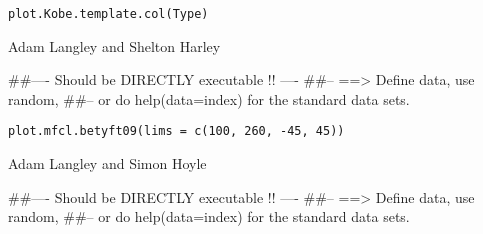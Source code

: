 \documentclass[a4paper]{book}
\begin{document}
%
\begin{Usage}
\begin{verbatim}
plot.Kobe.template.col(Type)
\end{verbatim}
\end{Usage}
%
\begin{Arguments}
\begin{ldescription}
\item[\code{Type}] 


\end{ldescription}
\end{Arguments}
%
\begin{Author}\relax

Adam Langley and Shelton Harley
\end{Author}
%
\begin{Examples}
\begin{ExampleCode}
##---- Should be DIRECTLY executable !! ----
##-- ==>  Define data, use random,
##--	or do  help(data=index)  for the standard data sets.

\end{ExampleCode}
\end{Examples}
%
\begin{Usage}
\begin{verbatim}
plot.mfcl.betyft09(lims = c(100, 260, -45, 45))
\end{verbatim}
\end{Usage}
%
\begin{Arguments}
\begin{ldescription}
\item[\code{lims}] 


\end{ldescription}
\end{Arguments}
%
\begin{Author}\relax

Adam Langley and Simon Hoyle
\end{Author}
%
\begin{Examples}
\begin{ExampleCode}
##---- Should be DIRECTLY executable !! ----
##-- ==>  Define data, use random,
##--	or do  help(data=index)  for the standard data sets.

\end{ExampleCode}
\end{Examples}
\end{document}
